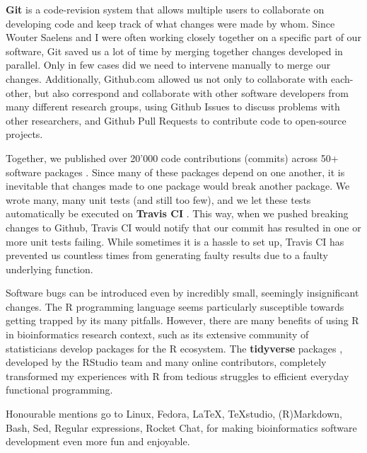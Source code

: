 \textbf{Git} \cite{torvalds_gitfastversion_2005} is a code-revision system that allows multiple users to collaborate on developing code and keep track of what changes were made by whom. 
Since Wouter Saelens and I were often working closely together on a specific part of our software, Git saved us a lot of time by merging together changes developed in parallel. Only in few cases did we need to intervene manually to merge our changes.
Additionally, Github.com allowed us not only to collaborate with each-other, but also correspond and collaborate with other software developers from many different research groups, using Github Issues to discuss problems with other researchers, and Github Pull Requests to contribute code to open-source projects. 

Together, we published over 20'000 code contributions (commits) across 50+ software packages \cite{cannoodt_developmentdynverse_2019}. Since many of these packages depend on one another, it is inevitable that changes made to one package would break another package. We wrote many, many unit tests (and still too few), and we let these tests automatically be executed on \textbf{Travis CI} \cite{traviscigmbh_traviscitest_2011}. This way, when we pushed breaking changes to Github, Travis CI would notify that our commit has resulted in one or more unit tests failing. While sometimes it is a hassle to set up, Travis CI has prevented us countless times from generating faulty results due to a faulty underlying function.

Software bugs can be introduced even by incredibly small, seemingly insignificant changes. The R programming language seems particularly susceptible towards getting trapped by its many pitfalls. However, there are many benefits of using R in bioinformatics research context, such as its extensive community of statisticians develop packages for the R ecosystem. The \textbf{tidyverse} packages \cite{wickham_welcometidyverse_2019}, developed by the RStudio team and many online contributors, completely transformed my experiences with R from tedious struggles to efficient everyday functional programming.

Honourable mentions go to Linux, Fedora, \LaTeX, TeXstudio, (R)Markdown, Bash, Sed, Regular expressions, Rocket Chat, for making bioinformatics software development even more fun and enjoyable.



